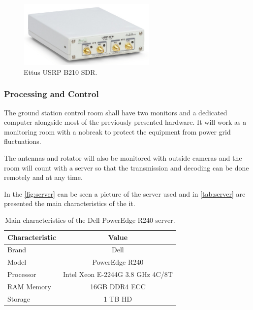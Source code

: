 \begin{figure}[!ht]
    \begin{center}
        \includegraphics[width=0.6\textwidth]{figures/usrp-b210.jpg}
        \caption{Ettus USRP B210 SDR.}
        \label{fig:usrp-b210}
    \end{center}
\end{figure}

\subsubsection{Processing and Control}

The ground station control room shall have two monitors and a dedicated computer alongside most of the previously presented hardware. It will work as a monitoring room with a nobreak to protect the equipment from power grid fluctuations. 

The antennas and rotator will also be monitored with outside cameras and the room will count with a server so that the transmission and decoding can be done remotely and at any time.

In the \autoref{fig:server} can be seen a picture of the server used and in \autoref{tab:server} are presented the main characteristics of the it.

\begin{table}[ht]
    \centering
    \begin{tabular}{lc}
        \toprule[1.5pt]
        \textbf{Characteristic} & \textbf{Value}    \\
        \midrule
        Brand                   & Dell     \\
        Model                   & PowerEdge R240     \\
        Processor               & Intel Xeon E-2244G 3.8 GHz 4C/8T            \\
        RAM Memory              & 16GB DDR4 ECC             \\
        Storage                 & 1 TB HD           \\
        \bottomrule[1.5pt]
    \end{tabular}
    \caption{Main characteristics of the Dell PowerEdge R240 server.}
    \label{tab:server}
\end{table}


